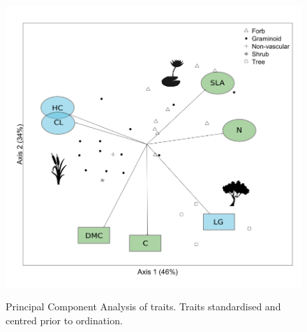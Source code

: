 \documentclass{article}
\begin{document}
\begin{figure}[!ht]
	\centering
	\scalebox{0.5}
	{\includegraphics{figs/pca.png}}
	\caption{Principal Component Analysis of traits. Traits standardised and centred prior to ordination.}
	\label{Fig:pca}
\end{figure}
\end{document}
